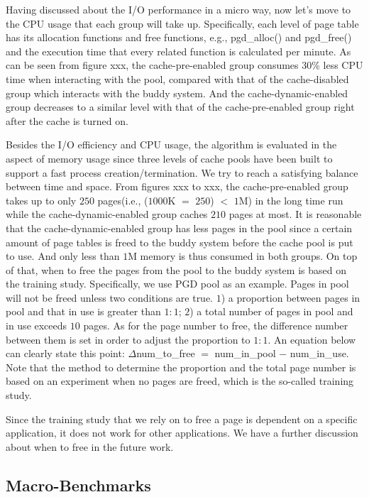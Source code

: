 \documentclass[letterpaper,twocolumn,10pt]{article}
\begin{document}
Having discussed about the I/O performance in a micro way, now let’s move to the CPU usage that each group will take up. Specifically, each level of page table has its allocation functions and free functions, e.g., pgd\_alloc() and pgd\_free() and the execution time that every related function is calculated per minute. As can be seen from figure xxx, the cache-pre-enabled group consumes 30\% less CPU time when interacting with the pool, compared with that of the cache-disabled group which interacts with the buddy system. And the cache-dynamic-enabled group decreases to a similar level with that of the cache-pre-enabled group right after the cache is turned on.

Besides the I/O efficiency and CPU usage, the algorithm is evaluated in the aspect of memory usage since three levels of cache pools have been built to support a fast process creation/termination. We try to reach a satisfying balance between time and space. From figures xxx to xxx, the cache-pre-enabled group takes up to only $250$ pages(i.e., ($1000$K $=$ $250$) $<$ $1$M) in the long time run while the cache-dynamic-enabled group caches $210$ pages at most. It is reasonable that the cache-dynamic-enabled group has less pages in the pool since a certain amount of page tables is freed to the buddy system before the cache pool is put to use. And only less than $1$M memory is thus consumed in both groups. On top of that, when to free the pages from the pool to the buddy system is based on the training study. Specifically, we use PGD pool as an example. Pages in pool will not be freed unless two conditions are true. $1$) a proportion between pages in pool and that in use is greater than $1:1$; $2$) a total number of pages in pool and in use exceeds $10$ pages. As for the page number to free, the difference number between them is set in order to adjust the proportion to $1:1$. An equation below can clearly state this point: $\Delta$num\_to\_free $=$ num\_in\_pool $-$ num\_in\_use. Note that the method to determine the proportion and the total page number is based on an experiment when no pages are freed, which is the so-called training study. 

Since the training study that we rely on to free a page is dependent on a specific application, it does not work for other applications. We have a further discussion about when to free in the future work.

\subsection{Macro-Benchmarks}
\end{document}

